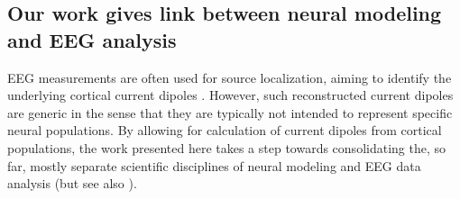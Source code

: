 \documentclass[preprint,10pt,authoryear]{elsarticle}
\newcommand{\gex}[1]{{\color{Orange}#1}}
\begin{document}

\gex{\subsection{Our work gives link between neural modeling and EEG analysis}}
EEG measurements are often used for source localization, aiming to identify the underlying cortical current dipoles \citep{NUNEZ2006, Gramfort2014, Ilmoniemi2019}. However, such reconstructed current dipoles are generic in the sense that they are typically not intended to represent specific neural populations. By allowing for calculation of current dipoles from cortical populations, the work presented here takes a step towards consolidating the, so far, mostly separate scientific disciplines of neural modeling and EEG data analysis (but see also \cite{NEYMOTIN2020}).

%
\end{document}
